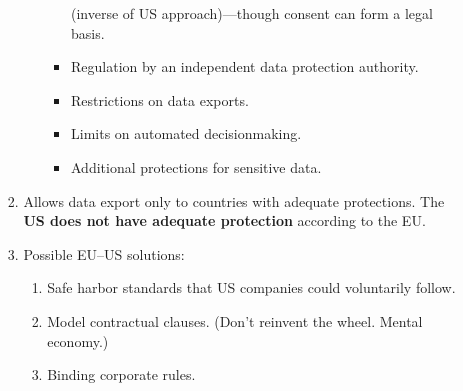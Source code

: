 \begin{enumerate}
\begin{enumerate}
\begin{enumerate}
\begin{enumerate}
\begin{itemize}
                    (inverse of US approach)---though consent can form a legal 
                    basis.
                    \item Regulation by an independent data protection 
                    authority.
                    \item Restrictions on data exports.
                    \item Limits on automated decisionmaking.
                    \item Additional protections for sensitive data.
                \end{itemize}
            \end{enumerate}
            \item Allows data export only to countries with adequate 
            protections. The \textbf{US does not have adequate protection} 
            according to the EU.
            \item Possible EU--US solutions:
            \begin{enumerate}
                \item Safe harbor standards that US companies could 
                voluntarily follow.
                \item Model contractual clauses. (Don't reinvent the wheel. 
                Mental economy.)
                \item Binding corporate rules.
            \end{enumerate}
        \end{enumerate}
    \end{enumerate}
\end{enumerate}
